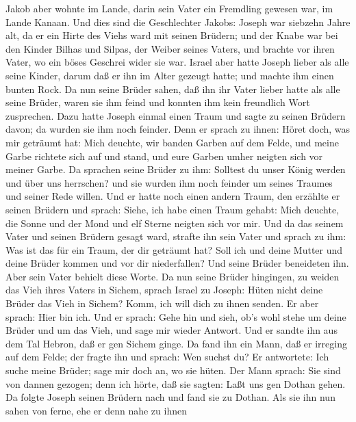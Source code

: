  Jakob aber wohnte im Lande, darin sein Vater ein Fremdling
gewesen war, im Lande Kanaan.  Und dies sind die
Geschlechter Jakobs: Joseph war siebzehn Jahre alt, da er ein Hirte des
Viehs ward mit seinen Brüdern; und der Knabe war bei den Kinder Bilhas
und Silpas, der Weiber seines Vaters, und brachte vor ihren Vater, wo
ein böses Geschrei wider sie war.  Israel aber hatte Joseph
lieber als alle seine Kinder, darum daß er ihn im Alter gezeugt hatte;
und machte ihm einen bunten Rock.  Da nun seine Brüder
sahen, daß ihn ihr Vater lieber hatte als alle seine Brüder, waren sie
ihm feind und konnten ihm kein freundlich Wort zusprechen. 
Dazu hatte Joseph einmal einen Traum und sagte zu seinen Brüdern davon;
da wurden sie ihm noch feinder.  Denn er sprach zu ihnen:
Höret doch, was mir geträumt hat:  Mich deuchte, wir banden
Garben auf dem Felde, und meine Garbe richtete sich auf und stand, und
eure Garben umher neigten sich vor meiner Garbe.  Da
sprachen seine Brüder zu ihm: Solltest du unser König werden und über
uns herrschen? und sie wurden ihm noch feinder um seines Traumes und
seiner Rede willen.  Und er hatte noch einen andern Traum,
den erzählte er seinen Brüdern und sprach: Siehe, ich habe einen Traum
gehabt: Mich deuchte, die Sonne und der Mond und elf Sterne neigten sich
vor mir.  Und da das seinem Vater und seinen Brüdern gesagt
ward, strafte ihn sein Vater und sprach zu ihm: Was ist das für ein
Traum, der dir geträumt hat? Soll ich und deine Mutter und deine Brüder
kommen und vor dir niederfallen?  Und seine Brüder
beneideten ihn. Aber sein Vater behielt diese Worte.  Da
nun seine Brüder hingingen, zu weiden das Vieh ihres Vaters in Sichem,
 sprach Israel zu Joseph: Hüten nicht deine Brüder das Vieh
in Sichem? Komm, ich will dich zu ihnen senden. Er aber sprach: Hier bin
ich.  Und er sprach: Gehe hin und sieh, ob's wohl stehe um
deine Brüder und um das Vieh, und sage mir wieder Antwort. Und er sandte
ihn aus dem Tal Hebron, daß er gen Sichem ginge.  Da fand
ihn ein Mann, daß er irreging auf dem Felde; der fragte ihn und sprach:
Wen suchst du?  Er antwortete: Ich suche meine Brüder; sage
mir doch an, wo sie hüten.  Der Mann sprach: Sie sind von
dannen gezogen; denn ich hörte, daß sie sagten: Laßt uns gen Dothan
gehen. Da folgte Joseph seinen Brüdern nach und fand sie zu Dothan.
 Als sie ihn nun sahen von ferne, ehe er denn nahe zu ihnen
